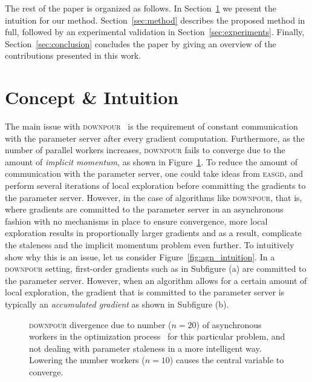 \documentclass[wcp]{jmlr}
\begin{document}
The rest of the paper is organized as follows. In Section~\ref{sec:concept_and_intuition} we present the intuition for our method. Section~\ref{sec:method} describes the proposed method in full, followed by an experimental validation in Section~\ref{sec:experiments}. Finally, Section~\ref{sec:conclusion} concludes the paper by giving an overview of the contributions presented in this work. 

\section{Concept \& Intuition}
\label{sec:concept_and_intuition}

The main issue with \textsc{downpour}~\cite{dean2012large} is the requirement of constant communication with the parameter server after every gradient computation. Furthermore, as the number of parallel workers increases, \textsc{downpour} fails to converge due to the amount of \emph{implicit momentum}, as shown in Figure~\ref{fig:downpour_convergence}. To reduce the amount of communication with the parameter server, one could take ideas from \textsc{easgd}, and perform several iterations of local exploration before committing the gradients to the parameter server. However, in the case of algorithms like \textsc{downpour}, that is, where gradients are committed to the parameter server in an asynchronous fashion with no mechanisms in place to ensure convergence, more local exploration results in proportionally larger gradients and as a result, complicate the staleness and the implicit momentum problem even further. To intuitively show why this is an issue, let us consider Figure~\ref{fig:agn_intuition}. In a \textsc{downpour} setting, first-order gradients such as in Subfigure (a) are committed to the parameter server. However, when an algorithm allows for a certain amount of local exploration, the gradient that is committed to the parameter server is typically an \emph{accumulated gradient} as shown in Subfigure (b).\\

\begin{figure}
    \centering
    \caption{\textsc{downpour} divergence due to number ($n = 20$) of asynchronous workers in the optimization process~\cite{implicitmomentum} for this particular problem, and not dealing with parameter staleness in a more intelligent way. Lowering the number workers ($n = 10$) causes the central variable to converge.}
    \label{fig:downpour_convergence}
\end{figure}
\end{document}
